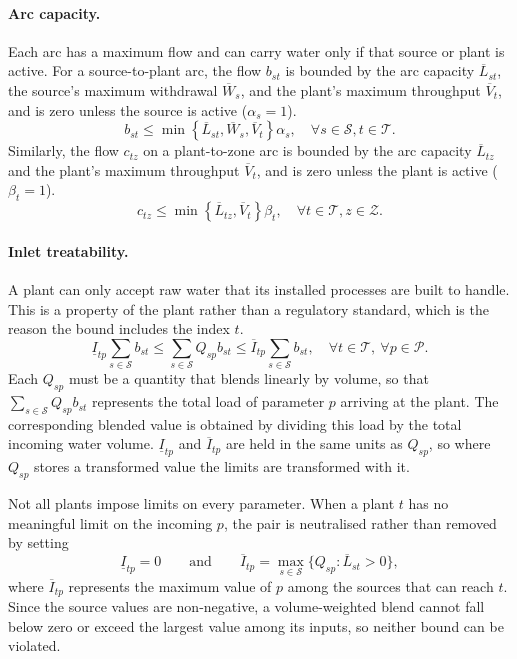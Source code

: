 \documentclass[10pt]{article}
\begin{document}
\paragraph{Arc capacity.}
Each arc has a maximum flow and can carry water only if that source or plant is active.
For a source-to-plant arc, the flow $b_{st}$ is bounded by the arc capacity $\overline{L}_{st}$, the source's maximum withdrawal $\overline{W}_s$, and the plant's maximum throughput $\overline{V}_t$, and is zero unless the source is active ($\alpha_s = 1$).
\begin{equation}\label{eq:arc_capacity_st}
    b_{st} \le \min \left\{\overline{L}_{st}, \overline{W}_s, \overline{V}_t \right\} \alpha_s, \quad \forall s \in \mathcal{S}, t \in \mathcal{T}.
\end{equation}
Similarly, the flow $c_{tz}$ on a plant-to-zone arc is bounded by the arc capacity $\overline{L}_{tz}$ and the plant's maximum throughput $\overline{V}_t$, and is zero unless the plant is active ($\beta_t = 1$).
\begin{equation}\label{eq:arc_capacity_tz}
    c_{tz} \le \min \left\{\overline{L}_{tz}, \overline{V}_t\right\} \beta_t, \quad \forall t \in \mathcal{T}, z \in \mathcal{Z}.
\end{equation}

\paragraph{Inlet treatability.}
A plant can only accept raw water that its installed processes are built to handle.
This is a property of the plant rather than a regulatory standard, which is the reason the bound includes the index $t$.
\begin{equation}\label{eq:inlet_treatability}
    \underline{I}_{tp} \sum_{s \in \mathcal{S}} b_{st}
    \le \sum_{s \in \mathcal{S}}
    Q_{sp} b_{st} \le \overline{I}_{tp} \sum_{s \in \mathcal{S}} b_{st}, \quad \forall t \in \mathcal{T},\ \forall p \in \mathcal{P}.
\end{equation}
Each $Q_{sp}$ must be a quantity that blends linearly by volume, so that $\sum_{s\in\mathcal S}Q_{sp}b_{st}$ represents the total load of parameter $p$ arriving at the plant.
The corresponding blended value is obtained by dividing this load by the total incoming water volume.
$\underline{I}_{tp}$ and $\overline{I}_{tp}$ are held in the same units as $Q_{sp}$, so where $Q_{sp}$ stores a transformed value the limits are transformed with it.

Not all plants impose limits on every parameter.
When a plant $t$ has no meaningful limit on the incoming $p$, the pair is neutralised rather than removed by setting
\begin{equation}\label{eq:inlet_treatability_neutral}
    \underline{I}_{tp} = 0
    \qquad \text{and} \qquad
    \overline{I}_{tp} = \max_{s \in \mathcal{S}}\{Q_{sp} : \overline{L}_{st} > 0\},
\end{equation}
where $\overline{I}_{tp}$ represents the maximum value of $p$ among the sources that can reach $t$.
Since the source values are non-negative, a volume-weighted blend cannot fall below zero or exceed the largest value among its inputs, so neither bound can be violated.
\end{document}
